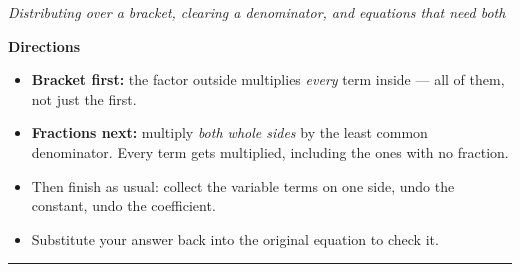 \documentclass[12pt]{article}
\begin{document}

\begin{center}
\textit{Distributing over a bracket, clearing a denominator, and equations that need both}
\end{center}

\noindent\textbf{Directions}
\begin{itemize}[leftmargin=0.9cm, itemsep=1pt, topsep=2pt]
  \item \textbf{Bracket first:} the factor outside multiplies \emph{every} term inside ---
        all of them, not just the first.
  \item \textbf{Fractions next:} multiply \emph{both whole sides} by the least common
        denominator. Every term gets multiplied, including the ones with no fraction.
  \item Then finish as usual: collect the variable terms on one side, undo the constant,
        undo the coefficient.
  \item Substitute your answer back into the original equation to check it.
\end{itemize}

\vspace{0.15cm}
\noindent\rule{\linewidth}{0.4pt}

\vspace{0.15cm}








\end{document}
